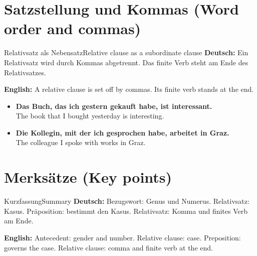 \documentclass[a4paper,11pt]{article}
\newcommand{\GermanText}[1]{\textbf{Deutsch: }#1\par}
\newcommand{\EnglishText}[1]{{\small\color{SoftGray}\textbf{English: }#1\par}}
\newcommand{\ExampleItem}[2]{\item \textbf{#1}\\{\small\color{SoftGray}#2}}
\begin{document}
\section{Satzstellung und Kommas (Word order and commas)}
\begin{grammarentry}{Relativsatz als Nebensatz}{Relative clause as a subordinate clause}
\GermanText{Ein Relativsatz wird durch Kommas abgetrennt. Das finite Verb steht am Ende des Relativsatzes.}
\EnglishText{A relative clause is set off by commas. Its finite verb stands at the end.}
\end{grammarentry}
\begin{exbox}\begin{itemize}
\ExampleItem{Das Buch, das ich gestern gekauft habe, ist interessant.}{The book that I bought yesterday is interesting.}
\ExampleItem{Die Kollegin, mit der ich gesprochen habe, arbeitet in Graz.}{The colleague I spoke with works in Graz.}
\end{itemize}\end{exbox}

\section{Merksätze (Key points)}
\begin{grammarentry}{Kurzfassung}{Summary}
\GermanText{Bezugswort: Genus und Numerus. Relativsatz: Kasus. Präposition: bestimmt den Kasus. Relativsatz: Komma und finites Verb am Ende.}
\EnglishText{Antecedent: gender and number. Relative clause: case. Preposition: governs the case. Relative clause: comma and finite verb at the end.}
\end{grammarentry}
\end{document}
